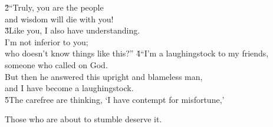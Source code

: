 \begin{poetry}
\poeml \v{2}``Truly, you are the people \\
\poemll    and wisdom will die with you! \\
\poeml \v{3}Like you, I also have understanding. \\
\poemll    I'm not inferior to you; \\
\poemlll       who doesn't know things like this?''
\poeml \v{4}``I'm a laughingstock to my friends, \\
\poemll    someone who called on God. \\
\poeml But then he answered this upright and blameless man, \\
\poemll    and I have become a laughingstock. \\
\poeml \v{5}The carefree are thinking, `I have contempt for misfortune,'
\end{poetry}

Those who are about to stumble deserve it.

